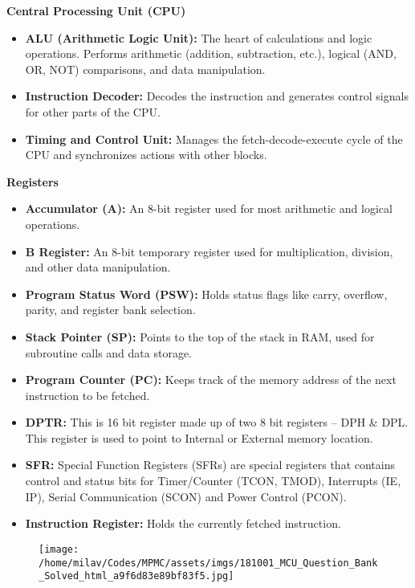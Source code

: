 \documentclass[
]{article}
\begin{document}
\textbf{Central Processing Unit (CPU)}

\begin{itemize}
\item
  \textbf{ALU (Arithmetic Logic Unit):} The heart of calculations and
  logic operations. Performs arithmetic (addition, subtraction, etc.),
  logical (AND, OR, NOT) comparisons, and data manipulation.
\item
  \textbf{Instruction Decoder:} Decodes the instruction and generates
  control signals for other parts of the CPU.
\item
  \textbf{Timing and Control Unit:} Manages the fetch-decode-execute
  cycle of the CPU and synchronizes actions with other blocks.
\end{itemize}

\textbf{Registers}

\begin{itemize}
\item
  \textbf{Accumulator (A):} An 8-bit register used for most arithmetic
  and logical operations.
\item
  \textbf{B Register:} An 8-bit temporary register used for
  multiplication, division, and other data manipulation.
\item
  \textbf{Program Status Word (PSW):} Holds status flags like carry,
  overflow, parity, and register bank selection.
\item
  \textbf{Stack Pointer (SP):} Points to the top of the stack in RAM,
  used for subroutine calls and data storage.
\item
  \textbf{Program Counter (PC):} Keeps track of the memory address of
  the next instruction to be fetched.
\item
  \textbf{DPTR:} This is 16 bit register made up of two 8 bit registers
  -- DPH \& DPL. This register is used to point to Internal or External
  memory location.
\item
  \textbf{SFR:} Special Function Registers (SFRs) are special registers
  that contains control and status bits for Timer/Counter (TCON, TMOD),
  Interrupts (IE, IP), Serial Communication (SCON) and Power Control
  (PCON).
\item
  \textbf{Instruction Register:} Holds the currently fetched
  instruction.
\end{itemize}

\begin{figure}
\centering
\texttt{[image: /home/milav/Codes/MPMC/assets/imgs/181001\_MCU\_Question\_Bank\_Solved\_html\_a9f6d83e89bf83f5.jpg]}
\caption{}
\end{figure}
\end{document}
